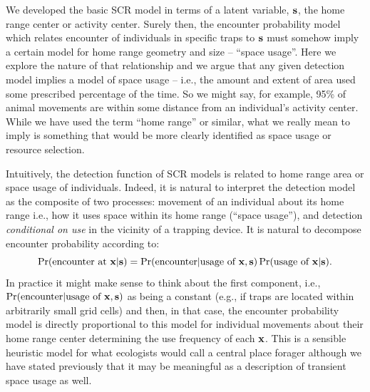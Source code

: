We developed the basic SCR model in terms of a latent variable, ${\bf
  s}$, the home range center or activity center.  Surely then, the
encounter probability model which relates encounter of individuals in
specific traps to ${\bf s}$ must somehow imply a certain model for
home range geometry and size -- ``space usage''.  Here we explore the
nature of that relationship and we argue that any given detection
model implies a model of space usage -- i.e., the amount and extent of
area used some prescribed percentage of the time. So we might say,
for example, 95\% of animal movements are within some distance from an
individual's activity center.  While we have used the term ``home
range'' or similar, what we really mean to imply is something that
would be more clearly identified as space usage  or
resource selection.

Intuitively, the detection function of SCR models is related to home
range area or space usage of individuals.  Indeed, it is natural
to interpret the detection model as the composite of two processes:
movement of an individual about its home range i.e., how it uses space
within its home range (``space usage''), and detection {\it
  conditional on use} in the vicinity of a trapping device.
It is natural to decompose encounter probability according to:
\[
 \Pr(\mbox{encounter at } {\bf x}|{\bf s})
 = \Pr(\mbox{encounter}| \mbox{usage of } {\bf x}, {\bf s})
\Pr(\mbox{usage of } {\bf x}|{\bf s}).
\]
In practice it might make sense to think about the first component,
i.e., $\Pr(\mbox{encounter} | \mbox{usage of } {\bf x}, {\bf s})$ as
being a constant (e.g., if traps are located within arbitrarily small
grid cells) and then, in that case, the encounter probability model is
directly proportional to this model for individual movements about
their home range center determining the use frequency of each ${\bf x}$.
This is a sensible heuristic model for what ecologists would call a
central place forager although we have stated previously that it may
be meaningful as a description of transient space usage as well.

